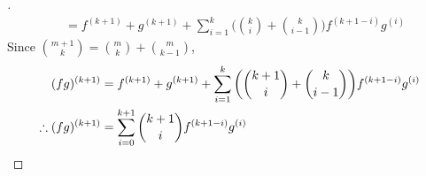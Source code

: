 \documentclass[paper=usletter, fontsize=12pt]{article}
\begin{document}
\begin{itemize}
\begin{itemize}
\begin{proof}[\unskip\nopunct]
\begin{align*}
                    & = f^{(k+1)} + g^{(k+1)} + \sum_{i=1}^{k} \bigg(\binom{k}{i} + \binom{k}{i-1}\bigg)f^{(k+1-i)}g^{(i)}
                \end{align*}
                Since $\binom{m+1}{k}=\binom{m}{k}+\binom{m}{k-1}$,
                \begin{align*}
                    (fg)^{(k+1)} & = f^{(k+1)} + g^{(k+1)} + \sum_{i=1}^{k} \bigg(\binom{k+1}{i} + \binom{k}{i-1}\bigg)f^{(k+1-i)}g^{(i)} \\
                    \therefore (fg)^{(k+1)} & = \sum_{i=0}^{k+1} \binom{k+1}{i}f^{(k+1-i)}g^{(i)}
                    \qedhere
                \end{align*}
            \end{proof}
            \vspace{0.2in}

        \end{itemize}

    \end{itemize}
\end{document}

